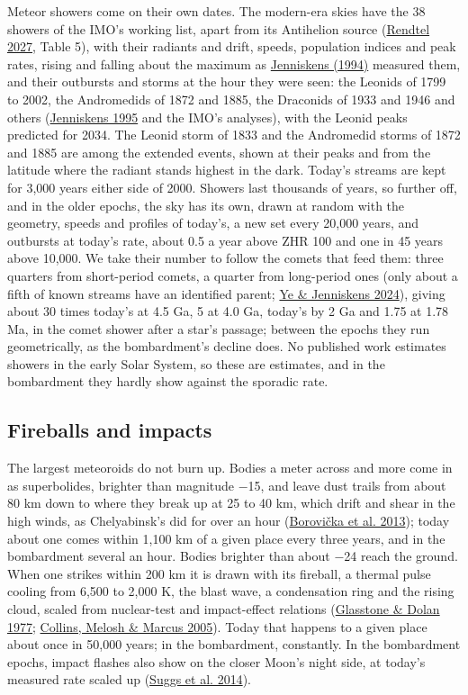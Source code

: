 \documentclass[9pt,twocolumn]{extarticle}
\begin{document}
Meteor showers come on their own dates. The modern-era skies have the 38 showers of the IMO's working list, apart from its Antihelion source (\protect\hyperlink{cite.rendtel2027}{Rendtel 2027}, Table 5), with their radiants and drift, speeds, population indices and peak rates, rising and falling about the maximum as \protect\hyperlink{cite.jenniskens1994}{Jenniskens (1994)} measured them, and their outbursts and storms at the hour they were seen: the Leonids of 1799 to 2002, the Andromedids of 1872 and 1885, the Draconids of 1933 and 1946 and others (\protect\hyperlink{cite.jenniskens1995}{Jenniskens 1995} and the IMO's analyses), with the Leonid peaks predicted for 2034. The Leonid storm of 1833 and the Andromedid storms of 1872 and 1885 are among the extended events, shown at their peaks and from the latitude where the radiant stands highest in the dark. Today's streams are kept for 3,000 years either side of 2000. Showers last thousands of years, so further off, and in the older epochs, the sky has its own, drawn at random with the geometry, speeds and profiles of today's, a new set every 20,000 years, and outbursts at today's rate, about 0.5 a year above ZHR 100 and one in 45 years above 10,000. We take their number to follow the comets that feed them: three quarters from short-period comets, a quarter from long-period ones (only about a fifth of known streams have an identified parent; \protect\hyperlink{cite.ye2022}{Ye \& Jenniskens 2024}), giving about 30 times today's at 4.5 Ga, 5 at 4.0 Ga, today's by 2 Ga and 1.75 at 1.78 Ma, in the comet shower after a star's passage; between the epochs they run geometrically, as the bombardment's decline does. No published work estimates showers in the early Solar System, so these are estimates, and in the bombardment they hardly show against the sporadic rate.


\subsection{Fireballs and impacts}\label{fireballs-and-impacts}

The largest meteoroids do not burn up. Bodies a meter across and more come in as superbolides, brighter than magnitude $-$15, and leave dust trails from about 80 km down to where they break up at 25 to 40 km, which drift and shear in the high winds, as Chelyabinsk's did for over an hour (\protect\hyperlink{cite.borovicka2013}{Borovička et al. 2013}); today about one comes within 1,100 km of a given place every three years, and in the bombardment several an hour. Bodies brighter than about $-$24 reach the ground. When one strikes within 200 km it is drawn with its fireball, a thermal pulse cooling from 6,500 to 2,000 K, the blast wave, a condensation ring and the rising cloud, scaled from nuclear-test and impact-effect relations (\protect\hyperlink{cite.glasstone1977}{Glasstone \& Dolan 1977}; \protect\hyperlink{cite.collins2005}{Collins, Melosh \& Marcus 2005}). Today that happens to a given place about once in 50,000 years; in the bombardment, constantly. In the bombardment epochs, impact flashes also show on the closer Moon's night side, at today's measured rate scaled up (\protect\hyperlink{cite.suggs2014}{Suggs et al. 2014}).
\end{document}
